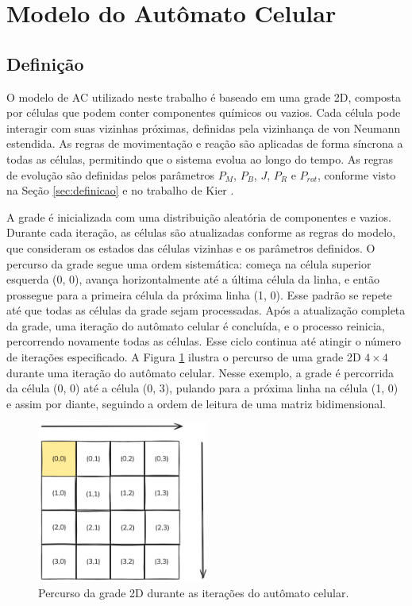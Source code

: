 \documentclass[12pt,oneside]{report}
\begin{document}
\section{Modelo do Autômato Celular}

\subsection{Definição}

O modelo de AC utilizado neste trabalho é baseado em uma grade 2D, composta por células que podem conter componentes químicos ou vazios. Cada célula pode interagir com suas vizinhas próximas, definidas pela vizinhança de von Neumann estendida. As regras de movimentação e reação são aplicadas de forma síncrona a todas as células, permitindo que o sistema evolua ao longo do tempo. As regras de evolução são definidas pelos parâmetros \hyperref[subsubsec:Pm]{$P_M$}, \hyperref[subsubsec:Pb]{$P_B$}, \hyperref[subsubsec:J]{$J$}, \hyperref[subsubsec:Pr]{$P_R$} e \hyperref[subsubsec:Prot]{$P_{rot}$}, conforme visto na Seção \ref{sec:definicao} e no trabalho de Kier \cite{kier2005}.

A grade é inicializada com uma distribuição aleatória de componentes e vazios. Durante cada iteração, as células são atualizadas conforme as regras do modelo, que consideram os estados das células vizinhas e os parâmetros definidos. O percurso da grade segue uma ordem sistemática: começa na célula superior esquerda (0, 0), avança horizontalmente até a última célula da linha, e então prossegue para a primeira célula da próxima linha (1, 0). Esse padrão se repete até que todas as células da grade sejam processadas. Após a atualização completa da grade, uma iteração do autômato celular é concluída, e o processo reinicia, percorrendo novamente todas as células. Esse ciclo continua até atingir o número de iterações especificado. A Figura \ref{fig:percorre_grade} ilustra o percurso de uma grade 2D $4 \times 4$ durante uma iteração do autômato celular. Nesse exemplo, a grade é percorrida da célula (0, 0) até a célula (0, 3), pulando para a próxima linha na célula (1, 0) e assim por diante, seguindo a ordem de leitura de uma matriz bidimensional.

\begin{figure}[H]
    \centering
    \includegraphics[width=0.5\textwidth]{img/percorre_grade.png}
    \caption{\small Percurso da grade 2D durante as iterações do autômato celular.}
    \label{fig:percorre_grade}
\end{figure}
\end{document}
